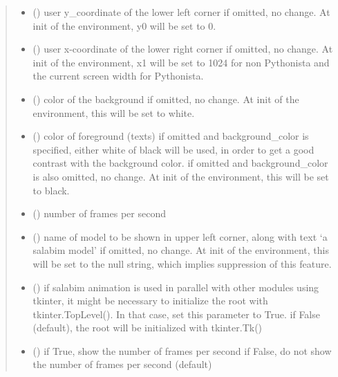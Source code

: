 \documentclass[letterpaper,10pt,english]{sphinxmanual}
\begin{document}
\begin{fulllineitems}
\begin{fulllineitems}
\begin{quote}
\begin{description}
\begin{itemize}
\item {} 
 () \textendash{} user y\_coordinate of the lower left corner 
if omitted, no change. At init of the environment, y0 will be set to 0.

\item {} 
 () \textendash{} user x-coordinate of the lower right corner 
if omitted, no change. At init of the environment, x1 will be set to 1024
for non Pythonista and the current screen width for Pythonista.

\item {} 
 () \textendash{} color of the background 
if omitted, no change. At init of the environment, this will be set to white.

\item {} 
 () \textendash{} color of foreground (texts) 
if omitted and background\_color is specified, either white of black will be used,
in order to get a good contrast with the background color. 
if omitted and background\_color is also omitted, no change. At init of the
environment, this will be set to black.

\item {} 
 () \textendash{} number of frames per second

\item {} 
 () \textendash{} name of model to be shown in upper left corner,
along with text ‘a salabim model’ 
if omitted, no change. At init of the environment, this will be set
to the null string, which implies suppression of this feature.

\item {} 
 () \textendash{} if salabim animation is used in parallel with
other modules using tkinter, it might be necessary to
initialize the root with tkinter.TopLevel().
In that case, set this parameter to True. 
if False (default), the root will be initialized with tkinter.Tk()

\item {} 
 () \textendash{} if True, show the number of frames per second 
if False, do not show the number of frames per second (default)


\end{itemize}
\end{description}
\end{quote}
\end{fulllineitems}
\end{fulllineitems}
\end{document}
